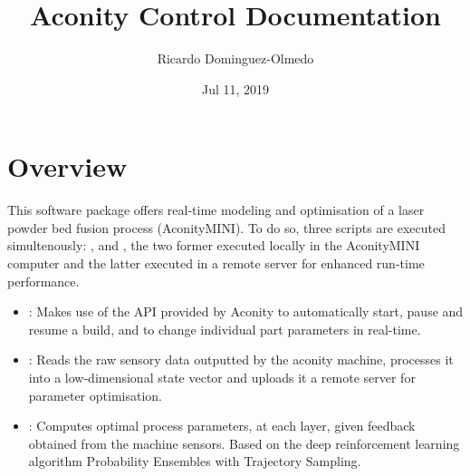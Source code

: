 \documentclass[letterpaper,10pt,english,openany,oneside]{sphinxmanual}
\title{Aconity Control Documentation}
\date{Jul 11, 2019}
\author{Ricardo Dominguez-Olmedo}
\begin{document}
\pagestyle{empty}
\sphinxmaketitle
\pagestyle{plain}
\sphinxtableofcontents
\pagestyle{normal}
\label{\detokenize{index::doc}}



\chapter{Overview}
\label{\detokenize{overview:overview}}\label{\detokenize{overview::doc}}
This software package offers real-time modeling and optimisation of a laser
powder bed fusion process (AconityMINI). To do so, three scripts are executed
simultenously: ,  and , the two former
executed locally in the AconityMINI computer and the latter executed in a remote
server for enhanced run-time performance.
\begin{itemize}
\item {} 
: Makes use of the API provided by Aconity to automatically start,
pause and resume a build, and to change individual part parameters in real-time.

\item {} 
: Reads the raw sensory data outputted by the aconity machine,
processes it into a low-dimensional state vector and uploads it a remote server for
parameter optimisation.

\item {} 
: Computes optimal process parameters, at each layer, given
feedback obtained from the machine sensors. Based on the deep reinforcement
learning algorithm Probability Ensembles with Trajectory Sampling.

\end{itemize}
\end{document}
